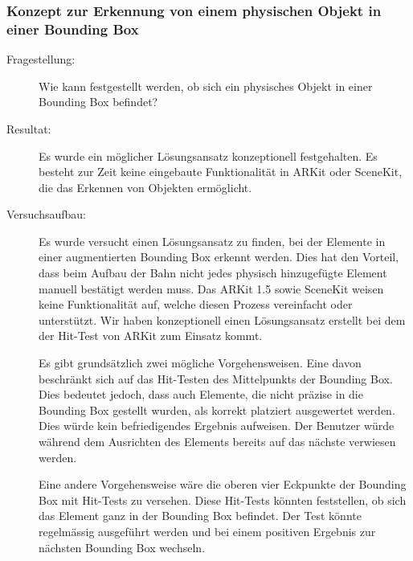 \subsubsection{Konzept zur Erkennung von einem physischen Objekt in einer Bounding Box}\label{subsub:prot-boundingbox}
\begin{description}
    \item[Fragestellung:] Wie kann festgestellt werden, ob sich ein physisches Objekt in einer Bounding Box befindet?
	\item[Resultat:] Es wurde ein möglicher Lösungsansatz konzeptionell festgehalten. Es besteht zur Zeit keine eingebaute Funktionalität in ARKit oder SceneKit, die das Erkennen von Objekten ermöglicht. 
    \item[Versuchsaufbau:] Es wurde versucht einen Lösungsansatz zu finden, bei der Elemente in einer augmentierten Bounding Box erkennt werden. Dies hat den Vorteil, dass beim Aufbau der Bahn nicht jedes physisch hinzugefügte Element manuell bestätigt werden muss. 
    Das ARKit 1.5 sowie SceneKit weisen keine Funktionalität auf, welche diesen Prozess vereinfacht oder unterstützt. Wir haben konzeptionell einen Lösungsansatz erstellt bei dem der Hit-Test von ARKit zum Einsatz kommt. 

    Es gibt grundsätzlich zwei mögliche Vorgehensweisen. Eine davon beschränkt sich auf das Hit-Testen des Mittelpunkts der Bounding Box. Dies bedeutet jedoch, dass auch Elemente, die nicht präzise in die Bounding Box gestellt wurden, als korrekt platziert ausgewertet werden. Dies würde kein befriedigendes Ergebnis aufweisen. Der Benutzer würde während dem Ausrichten des Elements bereits auf das nächste verwiesen werden. 
    
    Eine andere Vorgehensweise wäre die oberen vier Eckpunkte der Bounding Box mit Hit-Tests zu versehen. Diese Hit-Tests könnten feststellen, ob sich das Element ganz in der Bounding Box befindet. Der Test könnte regelmässig ausgeführt werden und bei einem positiven Ergebnis zur nächsten Bounding Box wechseln.


\end{description}

